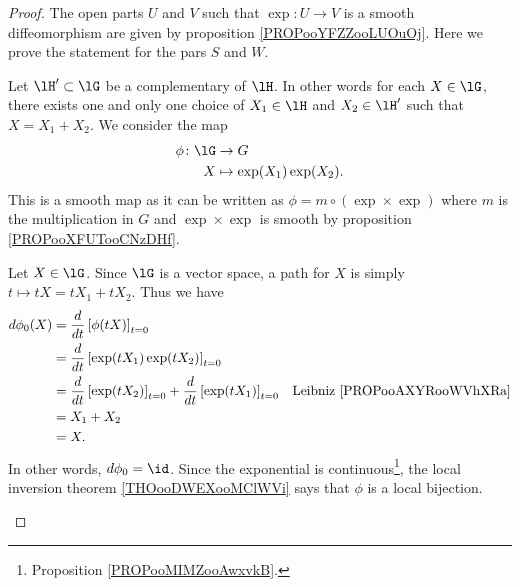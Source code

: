 \begin{proof}
	The open parts \( U\) and \( V\) such that \(\exp \colon U\to V  \) is a smooth diffeomorphism are given by proposition \ref{PROPooYFZZooLUOuOj}. Here we prove the statement for the pars \( S\) and \( W\).
	\begin{subproof}
		Let \( \lH'\subset \lG\) be a complementary of \( \lH\). In other words for each \( X\in \lG\), there exists one and only one choice of \( X_1\in \lH\) and \( X_2\in \lH'\) such that \( X=X_1+X_2\). We consider the map
		\begin{equation}
			\begin{aligned}
				\phi\colon \lG & \to G                       \\
				X              & \mapsto \exp(X_1)\exp(X_2).
			\end{aligned}
		\end{equation}
		This is a smooth map as it can be written as \( \phi=m\circ(\exp\times \exp)\) where \( m\) is the multiplication in \( G\) and \( \exp\times\exp\) is smooth by proposition \ref{PROPooXFUTooCNzDHf}.

		Let \( X\in\lG\). Since \( \lG\) is a vector space, a path for \( X\) is simply \( t\mapsto tX=tX_1+tX_2\). Thus we have
		\begin{subequations}
			\begin{align}
				d\phi_0(X) & =\frac{d}{dt} \left[ \phi(tX)  \right]_{t=0}                                                                                           \\
				           & =\frac{d}{dt} \left[ \exp(tX_1)\exp(tX_2)  \right]_{t=0}                                                                               \\
				           & =\frac{d}{dt} \left[ \exp(tX_2)  \right]_{t=0}+\frac{d}{dt} \left[ \exp(tX_1)  \right]_{t=0} & \text{Leibniz \ref{PROPooAXYRooWVhXRa}} \\
				           & =X_1+X_2                                                                                                                               \\
				           & =X.
			\end{align}
		\end{subequations}
		In other words, \( d\phi_0=\id\). Since the exponential is continuous\footnote{Proposition \ref{PROPooMIMZooAwxvkB}.}, the local inversion theorem \ref{THOooDWEXooMClWVi} says that \( \phi\) is a local bijection.


\end{subproof}
\end{proof}
